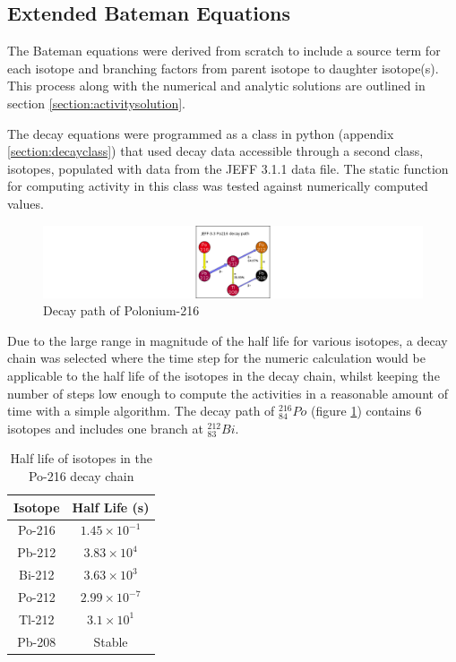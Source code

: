 \subsection{Extended Bateman Equations}

The Bateman equations were derived from scratch to include a source term for each isotope and branching factors from parent isotope to daughter isotope(s).  This process along with the numerical and analytic solutions are outlined in section \ref{section:activitysolution}.

\FloatBarrier

The decay equations were programmed as a class in python (appendix \ref{section:decayclass}) that used decay data accessible through a second class, isotopes, populated with data from the JEFF 3.1.1 data file.  The static function for computing activity in this class was tested against numerically computed values.  

\begin{figure}[h]
  \begin{center}
    \includegraphics[width=0.7\linewidth]{chapters/activity_code/84po216/84Po216_path.png}
    \caption{Decay path of Polonium-216}
    \label{fig:DecayPathPo216}
  \end{center}
\end{figure}

Due to the large range in magnitude of the half life for various isotopes, a decay chain was selected where the time step for the numeric calculation would be applicable to the half life of the isotopes in the decay chain, whilst keeping the number of steps low enough to compute the activities in a reasonable amount of time with a simple algorithm.  The decay path of  ${}^{216}_{84}Po$ (figure \ref{fig:DecayPathPo216}) contains 6 isotopes and includes one branch at ${}^{212}_{83}Bi$.

\begin{table}[h]
\begin{center}
\begin{tabular}{c c}
\hline\hline
Isotope & Half Life (s)\\
\hline\hline
Po-216 & $1.45 \times 10^{-1}$ \\
Pb-212 & $3.83 \times 10^{4}$ \\
Bi-212 & $3.63 \times 10^{3}$ \\
Po-212 & $2.99 \times 10^{-7}$ \\
Tl-212 & $3.1 \times 10^{1}$ \\
Pb-208 & Stable \\
\hline\hline
\end{tabular}
\end{center}
\caption{Half life of isotopes in the Po-216 decay chain}
\label{table:po216halflives}
\end{table}

